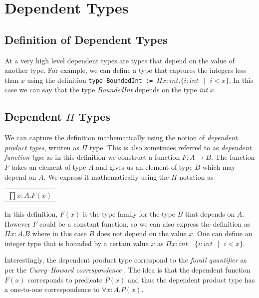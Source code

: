 \documentclass[a4paper,12pt]{report}
\begin{document}
\section{Dependent Types}
\subsection{Definition of Dependent Types}
At a very high level dependent types are types that depend on the value of 
another type. For example, we can define a type that captures the  
integers less than $x$ using the definition 
\verb|type BoundedInt := |$\Pi x : int.\{i : int\text{ }|\text{ } i < x\}$. 
In this case we can say that the type \textit{BoundedInt} depends on the 
type \textit{int} $x$.

\subsection{Dependent $\Pi$ Types}
We can capture the definition mathematically using the notion of \textit{dependent 
product types}, written as $\Pi$ type. This is also sometimes referred to as 
\textit{dependent function type} as in this definition we construct a function 
$F: A \rightarrow B$. The function $F$ takes an element of type $A$ and 
gives us an element of type $B$ which may depend on $A$. We express it 
mathematically using the $\Pi$ notation as
\begin{center}
 \begin{tabular}{l}
   $\prod x: A.  F(x)$
 \end{tabular} 
\end{center}

In this definition, $F(x)$ is the type family for the type $B$ that depends on $A$.
However $F$ could be a constant function, so we can also express the definition 
as $\Pi x:A.B$ where in this case $B$ does not depend 
on the value $x$. One can define an integer type that is bounded by a certain 
value $x$ as $\Pi x:int.\text{ }\{ i:int\text{ }|\text{ }i < x\}$.

\par
Interestingly, the dependent product type correspond to the 
\textit{forall quantifier} as per 
the \textit{Curry–Howard correspondence} \cite{cHoward}. The idea is that the dependent 
function $F(x)$ corresponds to predicate $P(x)$ and thus the dependent product 
type has a one-to-one correspondence to $\forall x: A. P(x)$.
\end{document}
